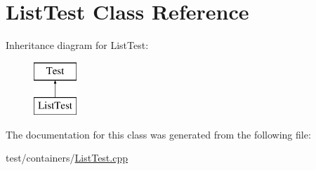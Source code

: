 \hypertarget{class_list_test}{}\section{List\+Test Class Reference}
\label{class_list_test}
Inheritance diagram for List\+Test\+:\begin{figure}[H]
\begin{center}
\leavevmode
\includegraphics[height=2.000000cm]{class_list_test}
\end{center}
\end{figure}


The documentation for this class was generated from the following file\+:\begin{DoxyCompactItemize}
\item 
test/containers/\hyperlink{_list_test_8cpp}{List\+Test.\+cpp}\end{DoxyCompactItemize}
